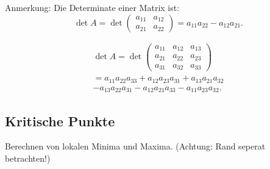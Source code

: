 Anmerkung: Die Determinate einer Matrix ist: 
$$\det A=\det
  \begin{pmatrix}
    a_{11} & a_{12} \\
    a_{21} & a_{22} 
  \end{pmatrix} 
= a_{11} a_{22} - a_{12} a_{21}.$$

\begin{equation}\begin{split}
\det A = \det
  \begin{pmatrix}
    a_{11} & a_{12} & a_{13} \\
    a_{21} & a_{22} & a_{23} \\
    a_{31} & a_{32} & a_{33} 
  \end{pmatrix}
\\= a_{11} a_{22} a_{33} +a_{12} a_{23} a_{31} + a_{13} a_{21} a_{32} 
\\ - a_{13} a_{22} a_{31} - a_{12} a_{21} a_{33} - a_{11} a_{23} a_{32}.
\end{split}\end{equation}

\subsection{Kritische Punkte}
Berechnen von lokalen Minima und Maxima. (Achtung: Rand seperat betrachten!)

